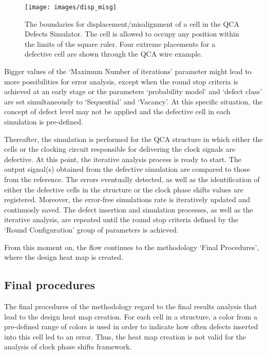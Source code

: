 \begin{figure}[H]
\center
\texttt{[image: images/disp\_misg]}
\caption{The boundaries for displacement/misalignment of a cell in the QCA Defects Simulator. The cell is allowed to occupy any position within the limits of the square ruler. Four extreme placements for a defective cell are shown through the QCA wire example.}
\label{figure:displacement_misalignment_boundaries}
\end{figure}

Bigger values of the `Maximum Number of iterations' parameter might lead to more possibilities for error analysis, except when the round stop criteria is achieved at an early stage or the parameters `probability model' and `defect class' are set simultaneously to `Sequential' and `Vacancy'. At this specific situation, the concept of defect level may not be applied and the defective cell in each simulation is pre-defined.

Thereafter, the simulation is performed for the QCA structure in which either the cells or the clocking circuit responsible for delivering the clock signals are defective. At this point, the iterative analysis process is ready to start. The output signal(s) obtained from the defective simulation are compared to those from the reference. The errors eventually detected, as well as the identification of either the defective cells in the structure or the clock phase shifts values are registered. Moreover, the error-free simulations rate is iteratively updated and continuosly saved. The defect insertion and simulation processes, as well as the iterative analysis, are repeated until the round stop criteria defined by the `Round Configuration' group of parameters is achieved.

From this moment on, the flow continues to the methodology  `Final Procedures', where the design heat map is created.

\subsection{Final procedures}
\label{subsection:final_procedures}

The final procedures of the methodology regard to the final results analysis that lead to the design heat map creation. For each cell in a structure, a color from a pre-defined range of colors is used in order to indicate how often defects inserted into this cell led to an error. Thus, the heat map creation is not valid for the analysis of clock phase shifts framework.

